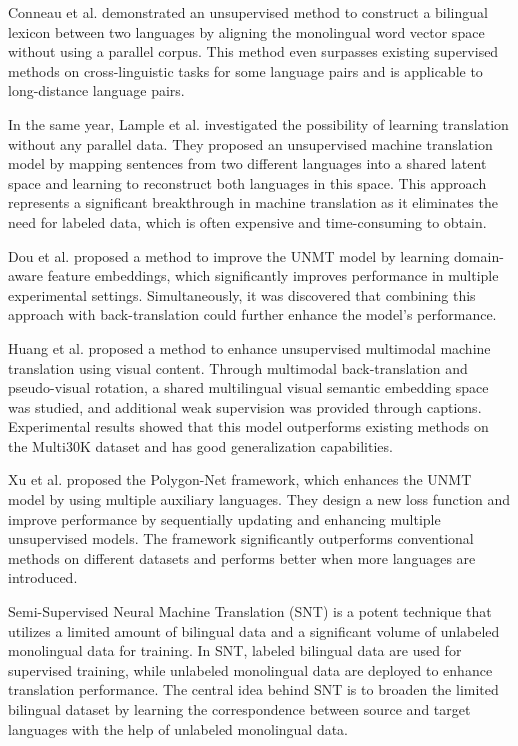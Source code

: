 \documentclass[acmsmall]{acmart}
\begin{document}
Conneau et al. \cite{n4-a2} demonstrated an unsupervised method to construct a bilingual lexicon between two languages by aligning the monolingual word vector space without using a parallel corpus. This method even surpasses existing supervised methods on cross-linguistic tasks for some language pairs and is applicable to long-distance language pairs. 

In the same year, Lample et al. \cite{n4-a3} investigated the possibility of learning translation without any parallel data. They proposed an unsupervised machine translation model by mapping sentences from two different languages into a shared latent space and learning to reconstruct both languages in this space. This approach represents a significant breakthrough in machine translation as it eliminates the need for labeled data, which is often expensive and time-consuming to obtain.

Dou et al. \cite{n4-76} proposed a method to improve the UNMT model by learning domain-aware feature embeddings, which significantly improves performance in multiple experimental settings. Simultaneously, it was discovered that combining this approach with back-translation could further enhance the model's performance.

Huang et al. \cite{n4-77} proposed a method to enhance unsupervised multimodal machine translation using visual content. Through multimodal back-translation and pseudo-visual rotation, a shared multilingual visual semantic embedding space was studied, and additional weak supervision was provided through captions. Experimental results showed that this model outperforms existing methods on the Multi30K dataset and has good generalization capabilities.


Xu et al. \cite{n4-78} proposed the Polygon-Net framework, which enhances the UNMT model by using multiple auxiliary languages. They design a new loss function and improve performance by sequentially updating and enhancing multiple unsupervised models. The framework significantly outperforms conventional methods on different datasets and performs better when more languages are introduced.

Semi-Supervised Neural Machine Translation (SNT) is a potent technique that utilizes a limited amount of bilingual data and a significant volume of unlabeled monolingual data for training. In SNT, labeled bilingual data are used for supervised training, while unlabeled monolingual data are deployed to enhance translation performance. The central idea behind SNT is to broaden the limited bilingual dataset by learning the correspondence between source and target languages with the help of unlabeled monolingual data. 
\end{document}
